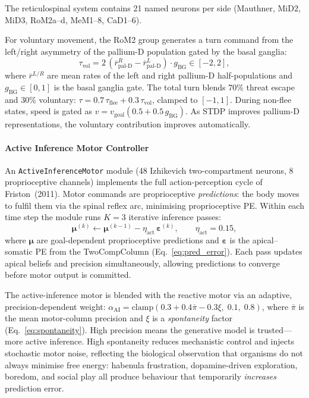 \documentclass[12pt]{article}
\begin{document}
\begin{sloppypar}
The reticulospinal system contains 21 named neurons per side
(Mauthner, MiD2, MiD3, RoM2a--d, MeM1--8, CaD1--6).
\end{sloppypar}
For voluntary movement, the RoM2 group generates a turn command
from the left/right asymmetry of the pallium-D population gated by
the basal ganglia:
\begin{equation}\label{eq:rs_voluntary}
  \tau_\text{vol} = 2\,(\bar{r}_\text{pal-D}^R - \bar{r}_\text{pal-D}^L)
    \cdot g_\text{BG} \in [-2,2],
\end{equation}
where $\bar{r}^{L/R}$ are mean rates of the left and right
pallium-D half-populations and $g_\text{BG} \in [0,1]$ is the
basal ganglia gate.
The total turn blends 70\% threat escape and 30\% voluntary:
$\tau = 0.7\,\tau_\text{flee} + 0.3\,\tau_\text{vol}$,
clamped to $[-1, 1]$.
During non-flee states, speed is gated as
$v = v_\text{goal}(0.5 + 0.5\,g_\text{BG})$.
As STDP improves pallium-D representations, the voluntary contribution
improves automatically.

\paragraph{Active Inference Motor Controller}

An \texttt{ActiveInferenceMotor} module (48 Izhikevich two-compartment
neurons, 8 proprioceptive channels) implements the full action-perception
cycle of Friston~(2011).  Motor commands are proprioceptive
\emph{predictions}: the body moves to fulfil them via the spinal
reflex arc, minimising proprioceptive PE.
Within each time step the module runs $K=3$ iterative inference passes:
\begin{equation}\label{eq:apc}
  \boldsymbol{\mu}^{(k)} \leftarrow \boldsymbol{\mu}^{(k-1)}
    - \eta_\text{act}\,\boldsymbol{\varepsilon}^{(k)},
  \qquad \eta_\text{act}=0.15,
\end{equation}
where $\boldsymbol{\mu}$ are goal-dependent proprioceptive predictions
and $\boldsymbol{\varepsilon}$ is the apical--somatic PE from the
TwoCompColumn (Eq.~\ref{eq:pred_error}).  Each pass updates apical beliefs
and precision simultaneously, allowing predictions to converge before
motor output is committed.

The active-inference motor is blended with the reactive motor via
an adaptive, precision-dependent weight:
$\alpha_\text{AI} = \text{clamp}(0.3 + 0.4\bar\pi - 0.3\xi,\; 0.1,\; 0.8)$,
where $\bar\pi$ is the mean motor-column precision and $\xi$ is a
\emph{spontaneity} factor (Eq.~\ref{eq:spontaneity}).
High precision means the generative model is trusted---more active
inference.  High spontaneity reduces mechanistic control and injects
stochastic motor noise, reflecting the biological observation that
organisms do not always minimise free energy: habenula frustration,
dopamine-driven exploration, boredom, and social play all produce
behaviour that temporarily \emph{increases} prediction error.
\end{document}
